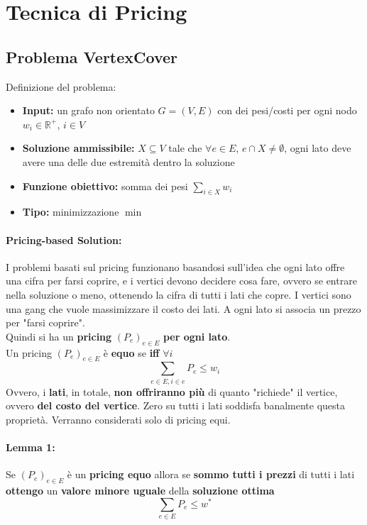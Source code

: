 
\section{Tecnica di Pricing}

\subsection{Problema VertexCover}

Definizione del problema: 
\begin{itemize}
	\item \textbf{Input:} un grafo non orientato $G =(V,E)$ con dei pesi/costi per ogni nodo $w_i \in \mathbb{R}^+$, $i \in V$
	\item \textbf{Soluzione ammissibile:} $X \subseteq V$ tale che $\forall e \in E$, $e \cap X \neq \emptyset$, ogni lato deve avere una delle due estremità dentro la soluzione
	\item \textbf{Funzione obiettivo:} somma dei pesi $\sum_{i \in X} w_i$
	\item \textbf{Tipo:} minimizzazione $\min$
\end{itemize}

\paragraph{Pricing-based Solution:} I problemi basati sul pricing funzionano basandosi sull'idea che ogni lato offre una cifra per farsi coprire, e i vertici devono decidere cosa fare, ovvero se entrare nella soluzione o meno, ottenendo la cifra di tutti i lati che copre. I vertici sono una gang che vuole massimizzare il costo dei lati. A ogni lato si associa un prezzo per "farsi coprire".\\
Quindi si ha un \textbf{pricing} $(P_e)_{e \in E}$ \textbf{per ogni lato}.\\

Un pricing $(P_e)_{e \in E}$ è \textbf{equo} se \textbf{iff} $\forall i$
$$ \sum_{e \in E, i \in e} P_e \leq w_i $$
Ovvero, i \textbf{lati}, in totale, \textbf{non offriranno più} di quanto "richiede" il vertice, ovvero \textbf{del costo del vertice}. Zero su tutti i lati soddisfa banalmente questa proprietà. Verranno considerati solo di pricing equi.\\

\newpage

\paragraph{Lemma 1:} Se $(P_e)_{e \in E}$ è un \textbf{pricing equo} allora se \textbf{sommo tutti i prezzi} di tutti i lati \textbf{ottengo} un \textbf{valore minore uguale} della \textbf{soluzione ottima}
$$ \sum_{e \in E} P_e \leq w^\ast $$


